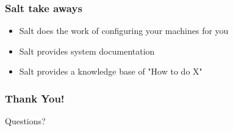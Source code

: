 \documentclass{beamer}
\begin{document}
\begin{frame}
\frametitle{Salt take aways}
\begin{itemize}
\item Salt does the work of configuring your machines for you
\item Salt provides system documentation
\item Salt provides a knowledge base of "How to do X"
\end{itemize}
\end{frame}

\begin{frame}
\frametitle{Thank You!}
Questions?
\end{frame}
\end{document}
